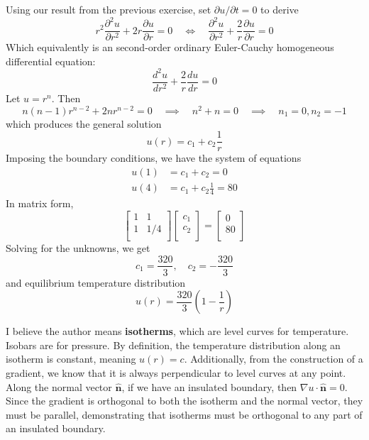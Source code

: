 \documentclass[a4paper]{article}
\begin{document}

Using our result from the previous exercise, set \( \partial u / \partial t = 0 \) to derive
\[
	r^{2}\frac{\partial^2 u}{\partial r^2} + 2r \frac{\partial u}{\partial r} = 0 \quad \iff \quad \frac{\partial^2 u}{\partial r^2} + \frac{2}{r}\frac{\partial u}{\partial r} = 0
\]
Which equivalently is an second-order ordinary Euler-Cauchy homogeneous differential equation:
\[
	\frac{d^2 u}{d r^2} + \frac{2}{r}\frac{d u}{d r} = 0 
\]
Let \( u = r^{n} \). Then
\[
	n \!\left( n - 1 \right)r^{n - 2} + 2n r^{n - 2} = 0 \quad \implies \quad n^{2} + n = 0 \quad \implies \quad n_{1} = 0, n_{2} = -1
\]
which produces the general solution
\[
	u \!\left( r \right) = c_{1} + c_{2}\frac{1}{r}
\]
Imposing the boundary conditions, we have the system of equations
\begin{align*}
	u \!\left( 1 \right) & = c_{1} + c_{2} = 0 \\
	u \!\left( 4 \right) & = c_{1} + c_{2}\frac{1}{4} = 80
\end{align*}
In matrix form,
\[
	\begin{bmatrix}
		1 & 1\\
		1 & 1 / 4 \\
	\end{bmatrix}
	\begin{bmatrix}
		c_{1} \\
		c_{2} \\
	\end{bmatrix}
	=
	\begin{bmatrix}
		0 \\
		80 \\
	\end{bmatrix}
\]
Solving for the unknowns, we get
\[
	c_{1} = \frac{320}{3}, \quad c_{2} = -\frac{320}{3} 
\]
and equilibrium temperature distribution
\[
	u \!\left( r \right) = \frac{320}{3}\!\left( 1 - \frac{1}{r} \right) 
\]


I believe the author means \textbf{isotherms}, which are level curves for temperature. Isobars are for pressure. By definition, the temperature distribution along an isotherm is constant, meaning \( u \!\left( r \right) = c \). Additionally, from the construction of a gradient, we know that it is always perpendicular to level curves at any point. Along the normal vector \( \pmb{\hat{n}} \), if we have an insulated boundary, then \( \nabla u \cdot \pmb{\hat{n}} = 0 \). Since the gradient is orthogonal to both the isotherm and the normal vector, they must be parallel, demonstrating that isotherms must be orthogonal to any part of an insulated boundary.
\end{document}
